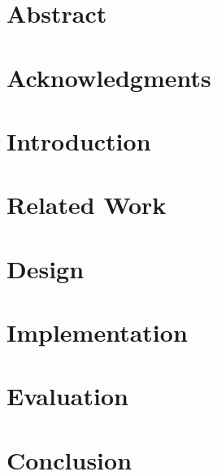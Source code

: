 \documentclass[12pt, a4paper]{book}
\begin{document}
\frontmatter
{}







\chapter{Abstract}

\chapter{Acknowledgments}

\mainmatter
\cleardoublepage
{}
{}
\tableofcontents 

\chapter{Introduction}
\label{sec:intro}
\cite{mach87ulvm}

\chapter{Related Work}
\label{sec:bgrelwork}

\chapter{Design} 
\label{sec:design}

\chapter{Implementation}
\label{sec:implementation}

\chapter{Evaluation}
\label{sec:evaluation}

\chapter{Conclusion}
\label{sec:conclusion}

\backmatter    
{}

\end{document}
